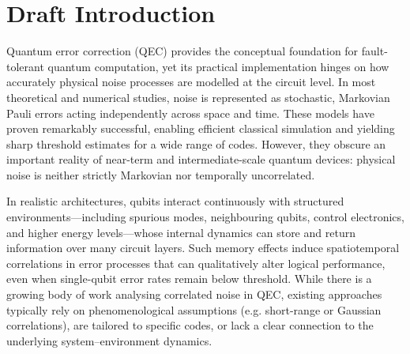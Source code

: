 \documentclass{article}
\begin{document}




\section{Draft Introduction}
Quantum error correction (QEC) provides the conceptual foundation for fault-tolerant quantum computation, yet its practical implementation hinges on how accurately physical noise processes are modelled at the circuit level. In most theoretical and numerical studies, noise is represented as stochastic, Markovian Pauli errors acting independently across space and time. These models have proven remarkably successful, enabling efficient classical simulation and yielding sharp threshold estimates for a wide range of codes. However, they obscure an important reality of near-term and intermediate-scale quantum devices: physical noise is neither strictly Markovian nor temporally uncorrelated.

In realistic architectures, qubits interact continuously with structured environments—including spurious modes, neighbouring qubits, control electronics, and higher energy levels—whose internal dynamics can store and return information over many circuit layers. Such memory effects induce spatiotemporal correlations in error processes that can qualitatively alter logical performance, even when single-qubit error rates remain below threshold. While there is a growing body of work analysing correlated noise in QEC, existing approaches typically rely on phenomenological assumptions (e.g. short-range or Gaussian correlations), are tailored to specific codes, or lack a clear connection to the underlying system–environment dynamics.
\end{document}
